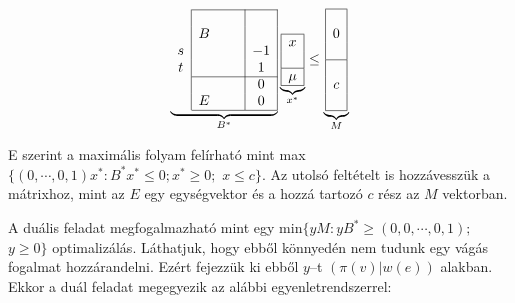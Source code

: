 \vspace{0.4cm}
\begin{figure}
	\begin{center}
		\vspace{-1.3cm}
		\begin{displaymath}
			\underbrace{
				\begin{array}{c|ccc|c|}
					\cline{2-5}
					  &   &  &  &    \\
					  & B &  &  &    \\
					s &   &  &  & -1 \\
					t &   &  &  & 1  \\
					\cline{2-5}
					  &   &  &  & 0  \\
					  & E &  &  & 0  \\
					\cline{2-5}
				\end{array}}_{B^*}
			\underbrace{
				\begin{array}{|c|}
					\hline
					x   \\
					\\
					\hline
					\mu \\
					\hline
				\end{array}}_{x^*}
			\leq
			\underbrace{
				\begin{array}{|c|}
					\hline
					\\
					0 \\
					\\
					\hline
					\\
					c \\
					\\
					\hline
				\end{array}}_{M}
		\end{displaymath}
		\vspace{-1.3cm}
	\end{center}
\end{figure}
E szerint a maximális folyam felírható mint max$\{ (0, \cdots,0,1)x^* : B^*x^* \leq
	0; x^* \geq 0;$ $x \leq c \}$. Az utolsó feltételt is hozzávesszük a mátrixhoz,
mint az $E$ egy egységvektor és a hozzá tartozó $c$ rész az $M$ vektorban.

A duális feladat megfogalmazható mint egy min$\{ yM :yB^* \geq (0, 0, \cdots, 0,
	1);$ $y \geq 0 \}$ optimalizálás. Láthatjuk, hogy ebből könnyedén nem tudunk egy
vágás fogalmat hozzárandelni. Ezért fejezzük ki ebből $y$--t $\left(
	\pi\left(v\right) | w\left(e\right)\right)$ alakban. Ekkor a duál feladat
megegyezik az alábbi egyenletrendszerrel:

